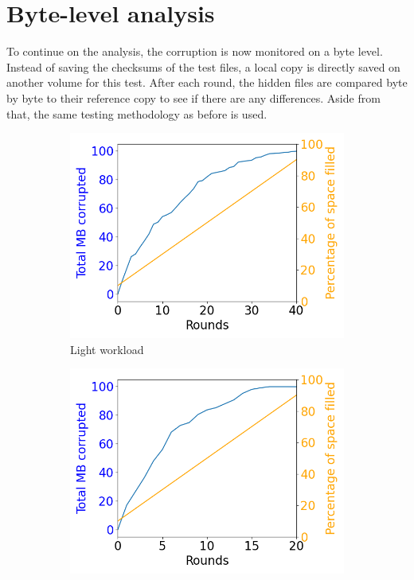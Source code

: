 \documentclass[a4paper,11pt,oneside]{report}
\begin{document}
\section{Byte-level analysis}

To continue on the analysis, the corruption is now monitored on a byte level. Instead of saving the checksums of the test files, a local copy is directly saved on another volume for this test. After each round, the hidden files are compared byte by byte to their reference copy to see if there are any differences. Aside from that, the same testing methodology as before is used.

\begin{figure}[ht]
     \centering
     \begin{subfigure}[b]{0.3\textwidth}
         \centering
         \includegraphics[width=\textwidth]{Figures/sum_byte_corrupt_1MB.png}
         \caption{Light workload}
         \label{fig:byte_light}
     \end{subfigure}
     \hfill
     \begin{subfigure}[b]{0.3\textwidth}
         \centering
         \includegraphics[width=\textwidth]{Figures/sum_byte_corrupt_2MB.png}

\end{subfigure}
\end{figure}
\end{document}

